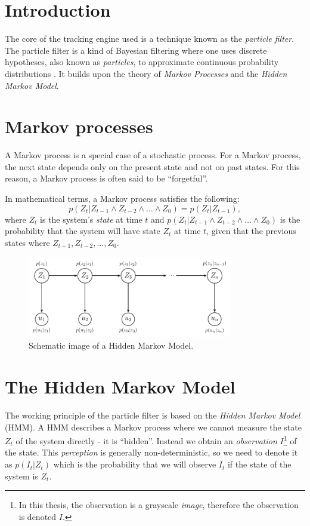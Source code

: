 \section{Introduction}
The core of the tracking engine used is a technique known as the \emph{particle filter}. The particle filter is a kind of Bayesian filtering where one uses discrete hypotheses, also known as \emph{particles}, to approximate continuous probability distributions \cite{ProbRob}. It builds upon the theory of \emph{Markov Processes} and the \emph{Hidden Markov Model}.

\section{Markov processes}
A Markov process is a special case of a stochastic process. For a Markov process, the next state depends only on the present state and not on past states. For this reason, a Markov process is often said to be ``forgetful''.

In mathematical terms, a Markov process satisfies the following:
\begin{equation}
 p\left(Z_t|Z_{t-1} \wedge Z_{t-2} \wedge \dots \wedge Z_0\right) = p\left(Z_t|Z_{t-1}\right),
\end{equation}
where $Z_t$ is the system's \emph{state} at time $t$ and $p\left(Z_t|Z_{t-1} \wedge Z_{t-2} \wedge \dots \wedge Z_0\right)$ is the probability that the system will have state $Z_t$ at time $t$, given that the previous states where $Z_{t-1}, Z_{t-2},\dots, Z_0$.


\begin{figure}
  \centering
  \includegraphics[width=0.8\textwidth]{hmm-graph.pdf}
  \caption{Schematic image of a Hidden Markov Model.}
  \label{fig:hmm-graph}
\end{figure}

\section{The Hidden Markov Model}

The working principle of the particle filter is based on the \emph{Hidden Markov Model} (HMM). A HMM describes a Markov process where we cannot measure the state $Z_t$ of the system directly - it is ``hidden''\cite{EncyclopediaMachineLearning}. Instead we obtain an \emph{observation} $I$\footnote{In this thesis, the observation is a grayscale \emph{image}, therefore the observation is denoted $I$.}  of the state. This \emph{perception} is generally non-deterministic, so we need to denote it as $p(I_t|Z_t)$ which is the probability that we will observe $I_t$ if the state of the system is $Z_t$.

